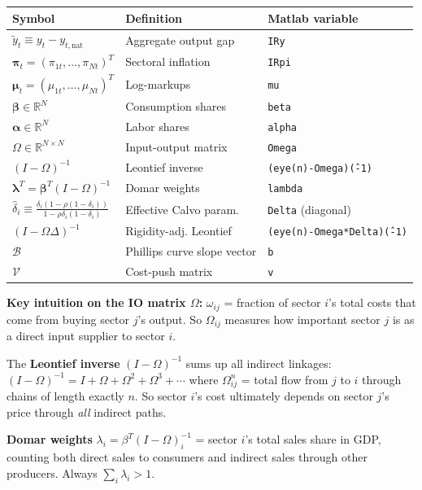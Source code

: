 \documentclass[12pt]{article}
\begin{document}
\begin{center}
\begin{tabular}{lll}
\toprule
\textbf{Symbol} & \textbf{Definition} & \textbf{Matlab variable} \\
\midrule
$\tilde{y}_t \equiv y_t - y_{t,\mathrm{nat}}$ & Aggregate output gap & \texttt{IRy} \\
$\bm{\pi}_t = (\pi_{1t},\ldots,\pi_{Nt})^T$ & Sectoral inflation & \texttt{IRpi} \\
$\bm{\mu}_t = (\mu_{1t},\ldots,\mu_{Nt})^T$ & Log-markups & \texttt{mu} \\
$\bm{\beta} \in \mathbb{R}^N$ & Consumption shares & \texttt{beta} \\
$\bm{\alpha} \in \mathbb{R}^N$ & Labor shares & \texttt{alpha} \\
$\Omega \in \mathbb{R}^{N\times N}$ & Input-output matrix & \texttt{Omega} \\
$(I - \Omega)^{-1}$ & Leontief inverse & \texttt{(eye(n)-Omega)\^(-1)} \\
$\bm{\lambda}^T = \bm{\beta}^T (I-\Omega)^{-1}$ & Domar weights & \texttt{lambda} \\
$\hat{\delta}_i \equiv \frac{\delta_i(1-\rho(1-\delta_i))}{1-\rho\delta_i(1-\delta_i)}$ & Effective Calvo param. & \texttt{Delta} (diagonal) \\
$(I-\Omega\Delta)^{-1}$ & Rigidity-adj. Leontief & \texttt{(eye(n)-Omega*Delta)\^(-1)} \\
$\mathcal{B}$ & Phillips curve slope vector & \texttt{b} \\
$\mathcal{V}$ & Cost-push matrix & \texttt{v} \\
\bottomrule
\end{tabular}
\end{center}

\begin{insight}
\textbf{Key intuition on the IO matrix $\Omega$:} $\omega_{ij}$ = fraction of sector $i$'s total costs that come from buying sector $j$'s output. So $\Omega_{ij}$ measures how important sector $j$ is as a direct input supplier to sector $i$.

The \textbf{Leontief inverse} $(I-\Omega)^{-1}$ sums up all indirect linkages:
$(I-\Omega)^{-1} = I + \Omega + \Omega^2 + \Omega^3 + \cdots$
where $\Omega^n_{ij}$ = total flow from $j$ to $i$ through chains of length exactly $n$. So sector $i$'s cost ultimately depends on sector $j$'s price through \textit{all} indirect paths.

\textbf{Domar weights} $\lambda_i = \beta^T (I-\Omega)^{-1}_i$ = sector $i$'s total sales share in GDP, counting both direct sales to consumers and indirect sales through other producers. Always $\sum_i \lambda_i > 1$.
\end{insight}
\end{document}
